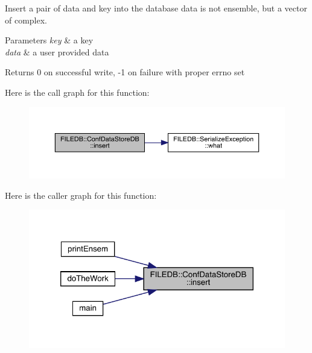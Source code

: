 Insert a pair of data and key into the database data is not ensemble, but a vector of complex. 
\begin{DoxyParams}{Parameters}
{\em key} & a key \\
\hline
{\em data} & a user provided data\\
\hline
\end{DoxyParams}
\begin{DoxyReturn}{Returns}
0 on successful write, -\/1 on failure with proper errno set 
\end{DoxyReturn}
Here is the call graph for this function\+:
\nopagebreak
\begin{figure}[H]
\begin{center}
\leavevmode
\includegraphics[width=350pt]{d8/d19/classFILEDB_1_1ConfDataStoreDB_a9917cff27ec340f88e59ddb9be630ecf_cgraph}
\end{center}
\end{figure}
Here is the caller graph for this function\+:
\nopagebreak
\begin{figure}[H]
\begin{center}
\leavevmode
\includegraphics[width=320pt]{d8/d19/classFILEDB_1_1ConfDataStoreDB_a9917cff27ec340f88e59ddb9be630ecf_icgraph}
\end{center}
\end{figure}
\mbox{\label{classFILEDB_1_1ConfDataStoreDB_a82fea8d8ac1a2c096614b213087a73d2}} 
